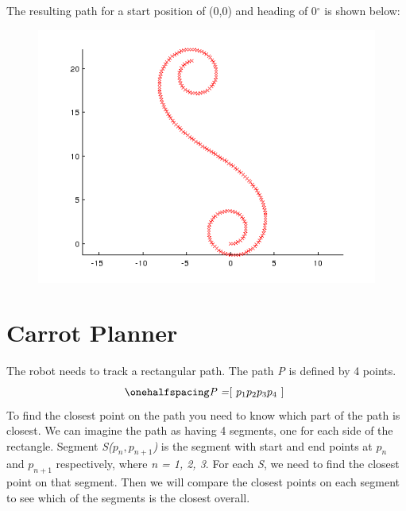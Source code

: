 \documentclass[12pt]{article}
\begin{document}
The resulting path for a start position of (0,0) and heading of 0$^\circ$ is shown below:
\begin{figure}[ht]
\hspace{0.5cm}
\centering
\includegraphics[scale=0.5]{Pictures/bikemodel.png}
\end{figure}

\newpage
\singlespacing
\section{Carrot Planner}
\setlength{\parindent}{1cm}

The robot needs to track a rectangular path. The path \textit{P} is defined by 4 points.
\begin{equation}
\onehalfspacing
\centering
\emph{P =\textnormal{\lbrack} $p_1 p_2 p_3 p_4$ \textnormal{\rbrack} }
\end{equation}
To find the closest point on the path you need to know which part of the path is closest. We can imagine the path as having 4 segments, one for each side of the rectangle. Segment \textit{S($p_n, p_{n+1}$)} is the segment with start and end points at \textit{$p_n$} and \textit{$p_{n+1}$} respectively, where \textit{n = 1, 2, 3}. For each \textit{S}, we need to find the closest point on that segment. Then we will compare the closest points on each segment to see which of the segments is the closest overall. 
\end{document}
